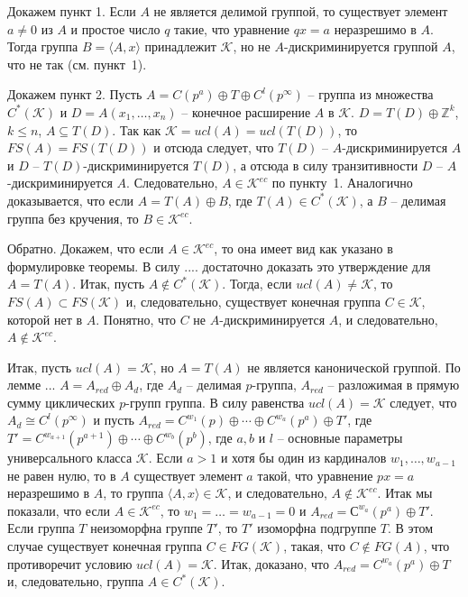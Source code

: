 \documentclass[12pt]{extarticle} %
\def\proof{{\noindent{\bf Доказательство.}} }
\def\K{{\mathcal{K}}}
\def\Kec{\mathcal{K}^{ec}}
\def\Z{{\mathbb{Z}}}
\begin{document}
\proof Докажем пункт 1. Если $A$ не является делимой группой, то существует элемент $a \neq 0$ из $A$ и простое число $q$ такие, что уравнение $qx = a$ неразрешимо в $A$. Тогда группа $B = \langle A, x\rangle$ принадлежит $\K$, но не $A$-дискриминируется группой $A$, что не так (см. пункт~1).

Докажем пункт 2. Пусть $A = C(p^a) \oplus T \oplus C^l(p^\infty)$ -- группа из множества $C^*(\K)$ и $D = A(x_1, \ldots, x_n)$ -- конечное расширение $A$ в $\K$. $D = T(D) \oplus \Z^k$, $k \leq n$, $A \subseteq T(D)$. Так как $\K = ucl(A) = ucl(T(D))$, то $FS(A) = FS(T(D))$ и отсюда следует, что $T(D)$ -- $A$-дискриминируется $A$ и $D$ -- $T(D)$-дискриминируется $T(D)$, а отсюда в силу транзитивности $D$ -- $A$-дискриминируется $A$. Следовательно, $A \in \Kec$ по пункту~1. Аналогично доказывается, что если $A = T(A) \oplus B$, где $T(A) \in C^*(\K)$, а $B$ -- делимая группа без кручения, то $B \in \Kec$.

Обратно. Докажем, что если $A \in \Kec$, то она имеет вид как указано в формулировке теоремы. В силу .... достаточно доказать это утверждение для $A = T(A)$. Итак, пусть $A \notin C^*(\K)$. Тогда, если $ucl(A) \neq \K$, то $FS(A) \subset FS(\K)$ и, следовательно, существует конечная группа $C \in \K$, которой нет в $A$. Понятно, что $C$ не $A$-дискриминируется $A$, и следовательно, $A \notin \Kec$.
 
Итак, пусть $ucl(A) = \K$, но $A = T(A)$ не является канонической группой. По лемме ...  $A = A_{red} \oplus A_d$, где $A_d$ -- делимая $p$-группа, $A_{red}$ -- разложимая в прямую сумму циклических $p$-групп группа. В силу равенства $ucl(A) = \K$ следует, что $A_d \cong C^l(p^\infty)$ и пусть $A_{red} = C^{w_1}(p) \oplus \cdots \oplus C^{w_a}(p^a) \oplus T'$, где $T' = C^{w_{a+1}}(p^{a+1}) \oplus \cdots \oplus C^{w_b}(p^b)$, где $a, b$ и $l$ -- основные параметры универсального класса $\K$. Если $a > 1$ и хотя бы один из кардиналов $w_1, \ldots, w_{a-1}$ не равен нулю, то в $A$ существует элемент $a$ такой, что уравнение $px = a$ неразрешимо в $A$, то группа $\langle A, x\rangle \in \K$, и следовательно, $A \notin \Kec$. Итак мы показали, что если $A \in \Kec$, то $w_1 = \ldots = w_{a-1} = 0$ и $A_{red} = С^{w_a} (p^a) \oplus T'$. Если группа $T$ неизоморфна группе $T'$, то $T'$ изоморфна подгруппе $T$. В этом случае существует конечная группа $C \in FG(\K)$, такая, что $C \notin FG(A)$, что противоречит условию $ucl(A) = \K$. Итак, доказано, что $A_{red} = C^{w_a}(p^a) \oplus T$ и, следовательно, группа $A \in C^*(\K)$. 
\end{document}
